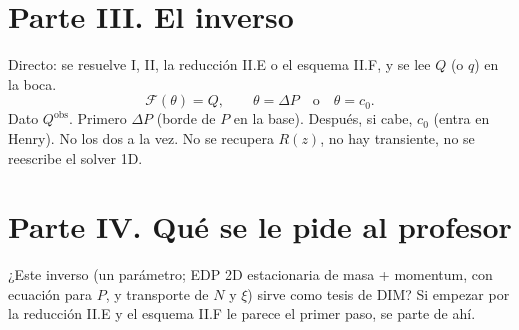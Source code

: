 \documentclass[11pt,a4paper]{article}
\newcommand{\F}{\mathcal{F}}
\begin{document}
\section*{Parte III. El inverso}

Directo: se resuelve I, II, la reducción II.E o el esquema
II.F, y se lee $Q$ (o $q$) en la boca.
\[
\F(\theta)=Q,
\qquad
\theta=\Delta P
\quad\text{o}\quad
\theta=c_0.
\]
Dato $Q^{\mathrm{obs}}$. Primero $\Delta P$ (borde de $P$ en
la base). Después, si cabe, $c_0$ (entra en Henry). No los
dos a la vez. No se recupera $R(z)$, no hay transiente, no
se reescribe el solver 1D.

\section*{Parte IV. Qué se le pide al profesor}

¿Este inverso (un parámetro; EDP 2D estacionaria de masa +
momentum, con ecuación para $P$, y transporte de $N$ y
$\xi$) sirve como tesis de DIM? Si empezar por la reducción
II.E y el esquema II.F le parece el primer paso, se parte
de ahí.
\end{document}
